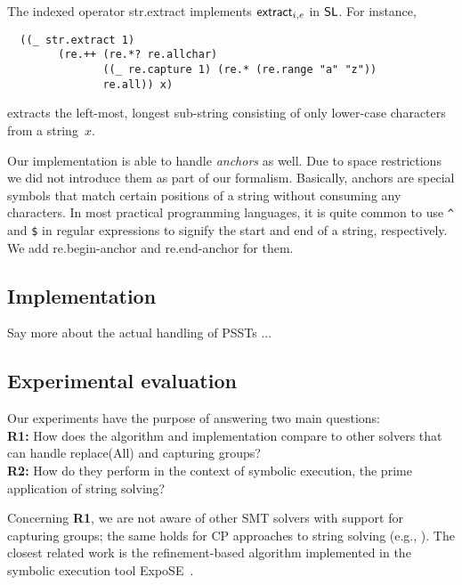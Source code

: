 The indexed operator {\sf str.extract} implements $\mathsf{extract}_{i, e}$ in
$\mathsf{SL}$. For instance,
%
\begin{verbatim}
  ((_ str.extract 1)
        (re.++ (re.*? re.allchar)
               ((_ re.capture 1) (re.* (re.range "a" "z"))
               re.all)) x)
\end{verbatim}
%
extracts the left-most, longest sub-string consisting of only lower-case
characters from a string~$x$.

Our implementation is able to handle \textit{anchors} as well. Due to space restrictions we did not introduce them as part of our formalism. Basically, anchors are special symbols that match certain positions of a string without consuming any characters. In most practical programming languages, it is quite common to use \verb!^! and \verb!$! in regular expressions to signify the start and end of a string, respectively. We add \textsf{re.begin-anchor} and \textsf{re.end-anchor} for them.

\subsection{Implementation}

Say more about the actual handling of PSSTs ...

\subsection{Experimental evaluation}

Our experiments have the purpose of answering two main questions:\\
\textbf{R1:} How does the algorithm and implementation compare to
other solvers
that can handle replace(All) and capturing groups?\\
\textbf{R2:} How do they perform in the context of symbolic execution,
the prime application of string solving?

Concerning \textbf{R1}, we are not aware of other SMT solvers with
support for capturing groups; the same holds for CP approaches to
string solving (e.g.,
\cite{DBLP:conf/cpaior/ScottFPS17,DBLP:conf/cp/AmadiniGS20}). The
closest related work is the refinement-based algorithm implemented in
the symbolic execution tool
ExpoSE~\cite{DBLP:conf/spin/LoringMK17,LMK19}. 

